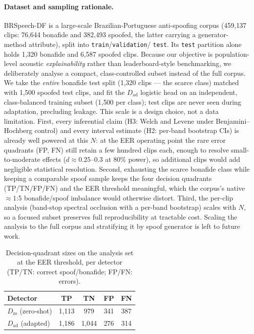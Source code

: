 \documentclass[sigconf]{acmart}
\begin{document}
\paragraph{Dataset and sampling rationale.}
BRSpeech-DF is a large-scale Brazilian-Portuguese anti-spoofing corpus
(459{,}137 clips: 76{,}644 bonafide and 382{,}493 spoofed, the latter carrying a
generator-method attribute), split into \texttt{train}/\texttt{validation}/%
\texttt{test}. Its \texttt{test} partition alone holds 1{,}320 bonafide and
6{,}587 spoofed clips. Because our objective is population-level acoustic
\emph{explainability} rather than leaderboard-style benchmarking, we deliberately
analyse a compact, class-controlled subset instead of the full corpus. We take the
\emph{entire} bonafide test split (1{,}320 clips --- the scarce class) matched
with 1{,}500 spoofed test clips, and fit the $D_\mathrm{ad}$ logistic head on an
independent, class-balanced training subset (1{,}500 per class); test clips are
never seen during adaptation, precluding leakage. This scale is a design choice,
not a data limitation. First, every inferential claim (H3: Welch and Levene under
Benjamini--Hochberg control) and every interval estimate (H2: per-band bootstrap
CIs) is already well powered at this $N$: at the EER operating point the rare error
quadrants (FP, FN) still retain a few hundred clips each, enough to resolve
small-to-moderate effects ($d\!\approx\!0.25$--$0.3$ at 80\% power), so additional
clips would add negligible statistical resolution. Second, exhausting the scarce
bonafide class while keeping a comparable spoof sample keeps the four decision
quadrants (TP/TN/FP/FN) and the EER threshold meaningful, which the corpus's native
$\approx$1:5 bonafide/spoof imbalance would otherwise distort. Third, the per-clip
analysis (band-stop spectral occlusion with a per-band bootstrap) scales with $N$,
so a focused subset preserves full reproducibility at tractable cost. Scaling the analysis to the full corpus and
stratifying it by spoof generator is left to future work.

\begin{table}[t]
  \caption{Decision-quadrant sizes on the analysis set at the EER threshold, per
  detector (TP/TN: correct spoof/bonafide; FP/FN: errors).}
  \label{tab:quadrants}
  \begin{tabular}{lcccc}
    \toprule
    Detector & TP & TN & FP & FN \\
    \midrule
    $D_\mathrm{zs}$ (zero-shot) & 1{,}113 & 979 & 341 & 387 \\
    $D_\mathrm{ad}$ (adapted)   & 1{,}186 & 1{,}044 & 276 & 314 \\
    \bottomrule
  \end{tabular}
\end{table}
\end{document}
